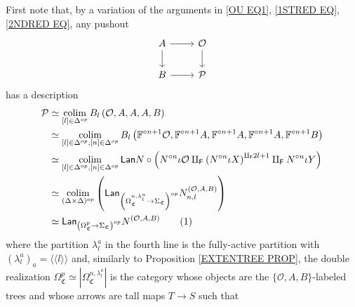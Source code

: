\documentclass[a4paper,10pt
,draft
]{article}%
\numberwithin{equation}{section}
\numberwithin{figure}{section}
\theoremstyle{definition} %
\DeclareMathOperator{\colim}{colim}%
\renewcommand{\O}{\ensuremath{\mathcal O}}
\newcommand{\1}{\ensuremath{\mathbbm 1}}%
\newcommand{\OC}{\Omega_{\mathfrak C}}
\begin{document}
First note that, by a variation of the arguments in \eqref{OU EQ1}, \eqref{1STRED EQ}, \eqref{2NDRED EQ},
any pushout 
\[
\begin{tikzcd}
	A \ar{r} \ar{d} & \mathcal{O} \ar{d}
\\
	B \ar{r} & \mathcal{P}
\end{tikzcd}
\]
has a description
\begin{align*}
  \mathcal{P}
  &
    \simeq \colim_{[l] \in \Delta^{op}} 
    B_l \left( \O, A, A, A, B \right)
  \\
  &
    \simeq \colim_{[l] \in \Delta^{op},[n] \in \Delta^{op}} 
    B_l \left( \mathbb F^{\circ n+1} \O, \mathbb F^{\circ n+1} A, 
    \mathbb F^{\circ n+1} A, \mathbb F^{\circ n+1} A, \mathbb F^{\circ n+1} B \right)
\\
&
    \simeq \colim_{[l] \in \Delta^{op},[n] \in \Delta^{op}} 
    \mathsf{Lan} N \circ \left( N^{\circ n} \iota \O 
		\amalg_{\mathsf{F}}
	\left( N^{\circ n} \iota X\right)^{\amalg_{\mathsf{F}} 2l +1}
		\amalg_{\mathsf{F}}
	N^{\circ n} \iota Y \right)
\\
&	
	\simeq
	\mathop{\colim}\limits_{(\Delta \times \Delta)^{op}}
\left(
	\mathsf{Lan}_{\left(\Omega_{\mathfrak C}^{n,\lambda^a_l} \to \Sigma_{\mathfrak C}\right)^{op}} N_{n,l}^{(\O,A,B)}
\right)
\\
&	
	\simeq
	\mathsf{Lan}_{\left(\Omega_{\mathfrak C}^{p} \to
	\Sigma_{\mathfrak C}\right)^{op}} N^{(\O,A,B)}
    \stepcounter{equation}\tag{\theequation}\label{OU EQ2}
\end{align*}
where the partition $\lambda^a_l$ in the fourth line is the fully-active partition with $\left(\lambda^a_l\right)_a = \langle \langle l \rangle \rangle$
and, similarly to Proposition \ref{EXTENTREE PROP},
the double realization
$\OC^p \simeq |\Omega_{\mathfrak C}^{n,\lambda^a_l}|$
%
is the category whose objects are the
$\{\mathcal{O},A,B\}$-labeled trees
and whose arrows are tall maps $T \to S$ such that
\end{document}
